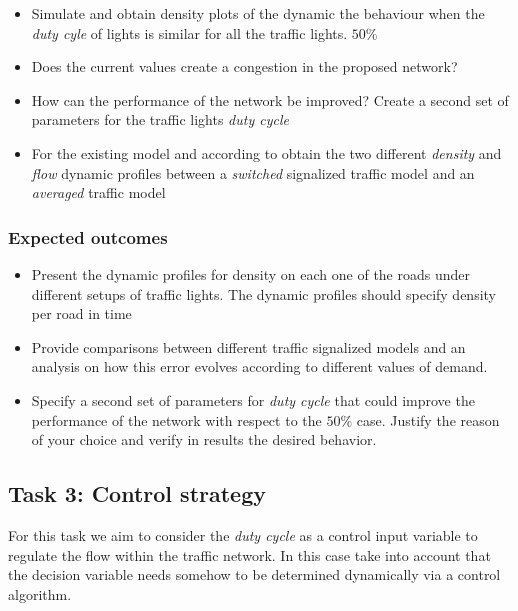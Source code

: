 \documentclass[]{book}
\theoremstyle{definition}
\theoremstyle{definition}
\theoremstyle{definition}
\theoremstyle{remark}
\begin{document}
\begin{itemize}
\item
  Simulate and obtain density plots of the dynamic the behaviour when
  the \emph{duty cyle} of lights is similar for all the traffic lights.
  \(50\%\)
\item
  Does the current values create a congestion in the proposed network?
\item
  How can the performance of the network be improved? Create a second
  set of parameters for the traffic lights \emph{duty cycle}
\item
  For the existing model and according to \autocite{Grandinetti2015}
  obtain the two different \emph{density} and \emph{flow} dynamic
  profiles between a \emph{switched} signalized traffic model and an
  \emph{averaged} traffic model
\end{itemize}

\hypertarget{expected-outcomes-1}{%
\subsubsection*{Expected outcomes}\label{expected-outcomes-1}}

\begin{itemize}
\item
  Present the dynamic profiles for density on each one of the roads
  under different setups of traffic lights. The dynamic profiles should
  specify density per road in time
\item
  Provide comparisons between different traffic signalized models and an
  analysis on how this error evolves according to different values of
  demand.
\item
  Specify a second set of parameters for \emph{duty cycle} that could
  improve the performance of the network with respect to the \(50\%\)
  case. Justify the reason of your choice and verify in results the
  desired behavior.
\end{itemize}

\hypertarget{task-3-control-strategy}{%
\subsection*{Task 3: Control strategy}\label{task-3-control-strategy}}

For this task we aim to consider the \emph{duty cycle} as a control
input variable to regulate the flow within the traffic network. In this
case take into account that the decision variable needs somehow to be
determined dynamically via a control algorithm.
\end{document}
